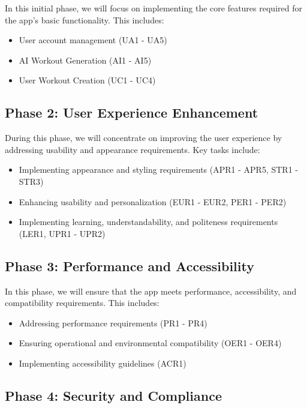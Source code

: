 \documentclass[12pt]{article}
\begin{document}
In this initial phase, we will focus on implementing the core features required for the app's basic functionality. This includes:

\begin{itemize}
\item User account management (UA1 - UA5)
\item AI Workout Generation (AI1 - AI5)
\item User Workout Creation (UC1 - UC4)
\end{itemize}

\subsection{Phase 2: User Experience Enhancement}

During this phase, we will concentrate on improving the user experience by addressing usability and appearance requirements. Key tasks include:

\begin{itemize}
\item Implementing appearance and styling requirements (APR1 - APR5, STR1 - STR3)
\item Enhancing usability and personalization (EUR1 - EUR2, PER1 - PER2)
\item Implementing learning, understandability, and politeness requirements (LER1, UPR1 - UPR2)
\end{itemize}

\subsection{Phase 3: Performance and Accessibility}

In this phase, we will ensure that the app meets performance, accessibility, and compatibility requirements. This includes:

\begin{itemize}
\item Addressing performance requirements (PR1 - PR4)
\item Ensuring operational and environmental compatibility (OER1 - OER4)
\item Implementing accessibility guidelines (ACR1)
\end{itemize}

\subsection{Phase 4: Security and Compliance}
\end{document}
